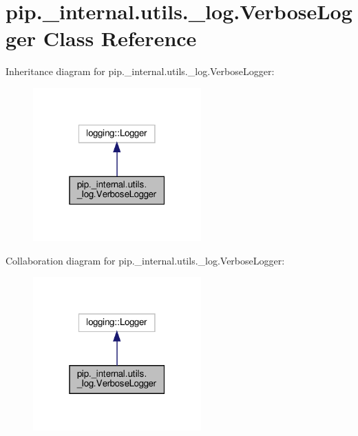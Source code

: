 \hypertarget{classpip_1_1__internal_1_1utils_1_1__log_1_1VerboseLogger}{}\section{pip.\+\_\+internal.\+utils.\+\_\+log.\+Verbose\+Logger Class Reference}
\label{classpip_1_1__internal_1_1utils_1_1__log_1_1VerboseLogger}


Inheritance diagram for pip.\+\_\+internal.\+utils.\+\_\+log.\+Verbose\+Logger\+:
\nopagebreak
\begin{figure}[H]
\begin{center}
\leavevmode
\includegraphics[width=183pt]{classpip_1_1__internal_1_1utils_1_1__log_1_1VerboseLogger__inherit__graph}
\end{center}
\end{figure}


Collaboration diagram for pip.\+\_\+internal.\+utils.\+\_\+log.\+Verbose\+Logger\+:
\nopagebreak
\begin{figure}[H]
\begin{center}
\leavevmode
\includegraphics[width=183pt]{classpip_1_1__internal_1_1utils_1_1__log_1_1VerboseLogger__coll__graph}
\end{center}
\end{figure}
